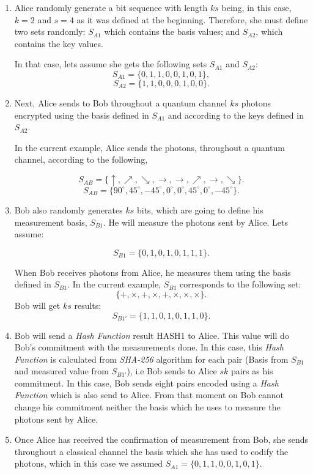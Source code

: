 \begin{enumerate}
  \item Alice randomly generate a bit sequence with length $ks$ being, in this case, $k=2$ and $s=4$ as it was defined at the beginning.
      Therefore, she must define two sets randomly: $S_{A1}$ which contains the basis values; and $S_{A2}$, which contains the key values.

      In that case, lets assume she gets the following sets $S_{A1}$ and $S_{A2}$:
      $$S_{A1} = \{0,1,1,0,0,1,0,1 \},$$
      $$S_{A2} = \{1,1,0,0,0,1,0,0 \}.$$

  \item Next, Alice sends to Bob throughout a quantum channel $ks$ photons encrypted using the basis defined in $S_{A1}$ and according to the keys defined in $S_{A2}$.

      In the current example, Alice sends the photons, throughout a quantum channel, according to the following,

      $$S_{AB} = \{\uparrow, \nearrow, \searrow, \to, \to, \nearrow, \to, \searrow \}.$$
       $$S_{AB} = \{90^{\circ}, 45^{\circ}, -45^{\circ}, 0^{\circ}, 0^{\circ}, 45^{\circ}, 0^{\circ}, -45^{\circ} \}.$$

  \item Bob also randomly generates $ks$ bits, which are going to define his measurement basis, $S_{B1}$. He will measure the photons sent by Alice. Lets assume:

  $$S_{B1} = \{0,1,0,1,0,1,1,1 \}.$$

    When Bob receives photons from Alice, he measures them using the basis defined in $S_{B1}$.
  In the current example, $S_{B1}$ corresponds to the following set:
  $$\{ +,\times,+,\times,+,\times, \times, \times \}.$$
  Bob will get $ks$ results:
  $$S_{B1'} = \{1,1,0,1,0,1,1,0 \}.$$

  \item Bob will send a \textit{Hash Function} result HASH1 to Alice. This value will do Bob's commitment with the measurements done. In this case, this \textit{Hash Function} is calculated from \textit{SHA-256} algorithm for each pair (Basis from $S_{B1}$ and measured value from $S_{B1'}$), i.e Bob sends to Alice $sk$ pairs as his commitment. In this case, Bob sends eight pairs encoded using a \textit{Hash Function} which is also send to Alice. From that moment on Bob cannot change his commitment neither the basis which he uses to measure the photons sent by Alice.

  \item Once Alice has received the confirmation of measurement from Bob, she sends throughout a classical channel the basis which she has used to codify the photons, which in this case we assumed $S_{A1} = \{0,1,1,0,0,1,0,1\}$.


\end{enumerate}
